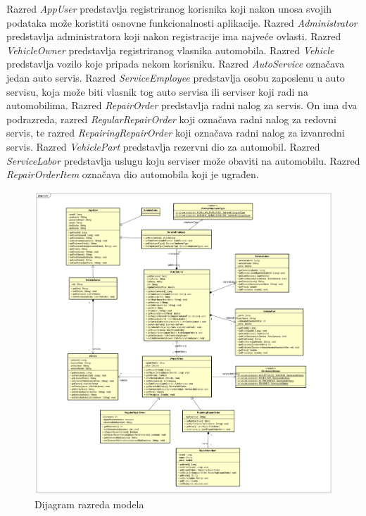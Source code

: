 		Razred \textit{AppUser} predstavlja registriranog korisnika koji nakon unosa svojih podataka može koristiti osnovne funkcionalnosti aplikacije. Razred \textit{Administrator} predstavlja administratora koji nakon registracije ima najveće ovlasti. Razred \textit{VehicleOwner} predstavlja registriranog vlasnika automobila. Razred \textit{Vehicle} predstavlja vozilo koje pripada nekom korisniku. Razred \textit{AutoService} označava jedan auto servis. Razred \textit{ServiceEmployee} predstavlja osobu zaposlenu u auto servisu, koja može biti vlasnik tog auto servisa ili serviser koji radi na automobilima. Razred \textit{RepairOrder} predstavlja radni nalog za servis. On ima dva podrazreda, razred \textit{RegularRepairOrder} koji označava radni nalog za redovni servis, te razred \textit{RepairingRepairOrder} koji označava radni nalog za izvanredni servis. Razred \textit{VehiclePart} predstavlja rezervni dio za automobil. Razred \textit{ServiceLabor} predstavlja uslugu koju serviser može obaviti na automobilu. Razred \textit{RepairOrderItem} označava dio automobila koji je ugrađen.
			
		\begin{figure}[h]
			\centering
			\includegraphics[width=1.0\linewidth]{dijagrami/class_diagram}
			\caption{Dijagram razreda modela}
			\label{fig:classdiagram}
		\end{figure}
			
